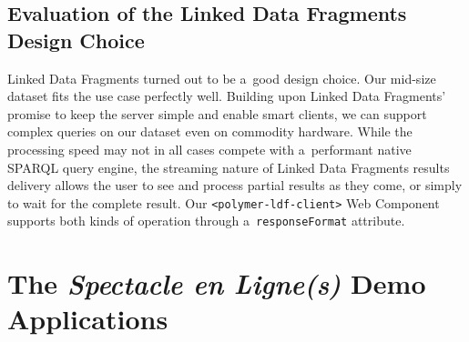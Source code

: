 \documentclass[runningheads,a4paper]{llncs}
\begin{document}
\subsection{Evaluation of the Linked Data Fragments Design Choice}

Linked Data Fragments turned out to be a~good design choice.
Our mid-size dataset fits the use case perfectly well.
Building upon Linked Data Fragments' promise to keep the server simple
and enable smart clients, we can support complex queries on our dataset
even on commodity hardware.
While the processing speed may not in all cases compete with a~performant
native SPARQL query engine, the streaming nature of Linked Data Fragments
results delivery allows the user to see and process partial results as they come,
or simply to wait for the complete result.
Our \texttt{<polymer-ldf-client>} Web Component supports both kinds of operation
through a~\texttt{responseFormat} attribute.

\section{The \emph{Spectacle en Ligne(s)} Demo Applications}
\end{document}
